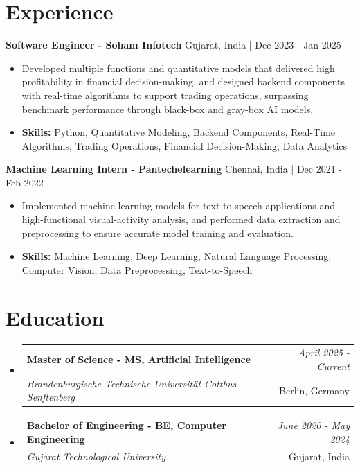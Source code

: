 \documentclass[a4paper,11pt]{article}
\makeatletter
\newcommand{\resumeSubheading}[4]{
\vspace{0.5mm}\item
    \begin{tabular*}{\linewidth}[t]{l@{\extracolsep{\fill}}r}
        \textbf{#1} & \textit{\footnotesize{#4}} \\
        \textit{\footnotesize{#3}} &  \footnotesize{#2}\\
    \end{tabular*}
    \vspace{-2.4mm}
}
\makeatother
\begin{document}
\section{\textbf{Experience}}


\vspace{1mm}
  \textbf{Software Engineer - Soham Infotech} \hfill Gujarat, India | Dec 2023 - Jan 2025
\vspace{-1.5mm} %
\begin{itemize}
  \item Developed multiple functions and quantitative models that delivered high profitability in financial decision-making, and designed backend components with real-time algorithms to support trading operations, surpassing benchmark performance through black-box and gray-box AI models.

\vspace{-2mm}
  \item \textbf{Skills:} Python, Quantitative Modeling, Backend Components, Real-Time Algorithms, Trading Operations, Financial Decision-Making, Data Analytics
\end{itemize}

\vspace{1mm}
  \textbf{Machine Learning Intern - Pantechelearning} \hfill Chennai, India | Dec 2021 - Feb 2022
\vspace{-1.5mm} %
\begin{itemize}
  \item Implemented machine learning models for text-to-speech applications and high-functional visual-activity analysis, and performed data extraction and preprocessing to ensure accurate model training and evaluation.
\vspace{-2mm}
  \item \textbf{Skills:} Machine Learning, Deep Learning, Natural Language Processing, Computer Vision, Data Preprocessing, Text-to-Speech
\end{itemize}\section{\textbf{Education}}
\vspace{-0.4mm}

\begin{itemize}[leftmargin=0.15in, label={}]
\resumeSubheading
{Master of Science - MS, Artificial Intelligence }{Berlin, Germany}
{Brandenburgische Technische Universität Cottbus-Senftenberg  }{April 2025 - Current}

\vspace{1.0mm} %
\resumeSubheading
{Bachelor of Engineering - BE, Computer Engineering  }{Gujarat, India}
{Gujarat Technological University }{June 2020 - May 2024}

\end{itemize}
\end{document}
